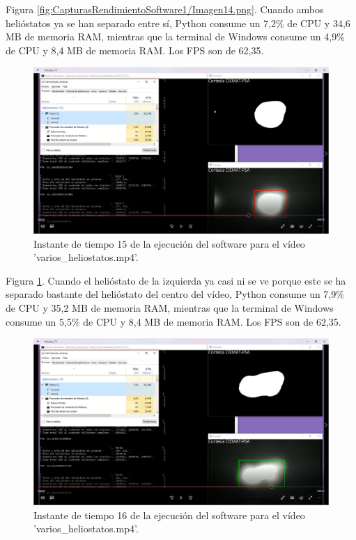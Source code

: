 Figura \ref{fig:CapturasRendimientoSoftware1/Imagen14.png}. Cuando ambos helióstatos ya se han separado entre sí, Python consume un 7,2\% de CPU y 34,6 MB de memoria RAM, mientras que la terminal de Windows consume un 4,9\% de CPU y 8,4 MB de memoria RAM. Los FPS son de 62,35.\\[20pt]

\begin{figure}[h!]
  	\centering
	\includegraphics[width=\textwidth]{CapturasRendimientoSoftware1/Imagen15.png}
	\caption{Instante de tiempo 15 de la ejecución del software para el vídeo 'varios\_heliostatos.mp4'.
	\label{fig:CapturasRendimientoSoftware1/Imagen15.png}}
\end{figure}

Figura \ref{fig:CapturasRendimientoSoftware1/Imagen15.png}. Cuando el helióstato de la izquierda ya casi ni se ve porque este se ha separado bastante del helióstato del centro del vídeo, Python consume un 7,9\% de CPU y 35,2 MB de memoria RAM, mientras que la terminal de Windows consume un 5,5\% de CPU y 8,4 MB de memoria RAM. Los FPS son de 62,35.\\[20pt]

\begin{figure}[h!]
  	\centering
	\includegraphics[width=\textwidth]{CapturasRendimientoSoftware1/Imagen16.png}
	\caption{Instante de tiempo 16 de la ejecución del software para el vídeo 'varios\_heliostatos.mp4'.
	\label{fig:CapturasRendimientoSoftware1/Imagen16.png}}
\end{figure}

